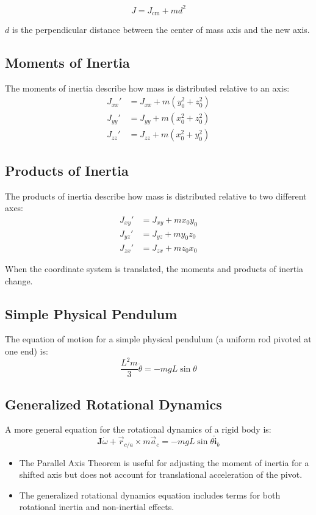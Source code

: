 \[
J = J_{\text{cm}} + m d^2
\]

$d$ is the perpendicular distance between the center of mass axis and the new axis.

\subsection{Moments of Inertia}
The moments of inertia describe how mass is distributed relative to an axis:
\begin{align*}
    J_{xx}' &= J_{xx} + m (y_0^2 + z_0^2) \\
    J_{yy}' &= J_{yy} + m (x_0^2 + z_0^2) \\
    J_{zz}' &= J_{zz} + m (x_0^2 + y_0^2)
\end{align*}

\subsection{Products of Inertia}
The products of inertia describe how mass is distributed relative to two different axes:
\begin{align*}
    J_{xy}' &= J_{xy} + m x_0 y_0 \\
    J_{yz}' &= J_{yz} + m y_0 z_0 \\
    J_{zx}' &= J_{zx} + m z_0 x_0
\end{align*}

When the coordinate system is translated, the moments and products of inertia change.

\subsection{Simple Physical Pendulum}
The equation of motion for a simple physical pendulum (a uniform rod pivoted at one end) is:
\[
\frac{L^2 m}{3} \ddot{\theta} = -mgL \sin \theta
\]


\subsection{Generalized Rotational Dynamics}
A more general equation for the rotational dynamics of a rigid body is:
\[
\mathbf{J} \dot{\omega} + \vec{r}_{c/a} \times m \vec{a}_c = -mgL \sin \theta \hat{\mathbf{i}}_b
\]
\begin{itemize}
    \item The Parallel Axis Theorem is useful for adjusting the moment of inertia for a shifted axis but does not account for translational acceleration of the pivot.
    \item The generalized rotational dynamics equation includes terms for both rotational inertia and non-inertial effects.
\end{itemize}


